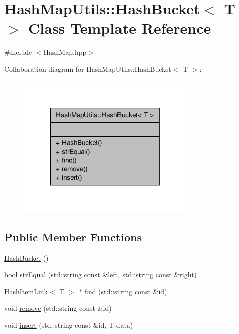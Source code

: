 \hypertarget{class_hash_map_utils_1_1_hash_bucket}{\section{Hash\-Map\-Utils\-:\-:Hash\-Bucket$<$ T $>$ Class Template Reference}
\label{class_hash_map_utils_1_1_hash_bucket}
}


{\ttfamily \#include $<$Hash\-Map.\-hpp$>$}



Collaboration diagram for Hash\-Map\-Utils\-:\-:Hash\-Bucket$<$ T $>$\-:
\nopagebreak
\begin{figure}[H]
\begin{center}
\leavevmode
\includegraphics[width=242pt]{class_hash_map_utils_1_1_hash_bucket__coll__graph}
\end{center}
\end{figure}
\subsection*{Public Member Functions}
\begin{DoxyCompactItemize}
\item 
\hyperlink{class_hash_map_utils_1_1_hash_bucket_ac7ba90f71701975bdd140b731e44f35d}{Hash\-Bucket} ()
\item 
bool \hyperlink{class_hash_map_utils_1_1_hash_bucket_a939e10a16348fc29380553d9fd4e0f97}{str\-Equal} (std\-::string const \&left, std\-::string const \&right)
\item 
\hyperlink{class_hash_map_utils_1_1_hash_item_link}{Hash\-Item\-Link}$<$ T $>$ $\ast$ \hyperlink{class_hash_map_utils_1_1_hash_bucket_a2e6dd28092f6b4ce37061f33a991fd45}{find} (std\-::string const \&id)
\item 
void \hyperlink{class_hash_map_utils_1_1_hash_bucket_a8757599c44e952ccbb0a404238b34bfa}{remove} (std\-::string const \&id)
\item 
void \hyperlink{class_hash_map_utils_1_1_hash_bucket_a7ea13c55db34d280fd16b70c17bb2a62}{insert} (std\-::string const \&id, T data)
\end{DoxyCompactItemize}


